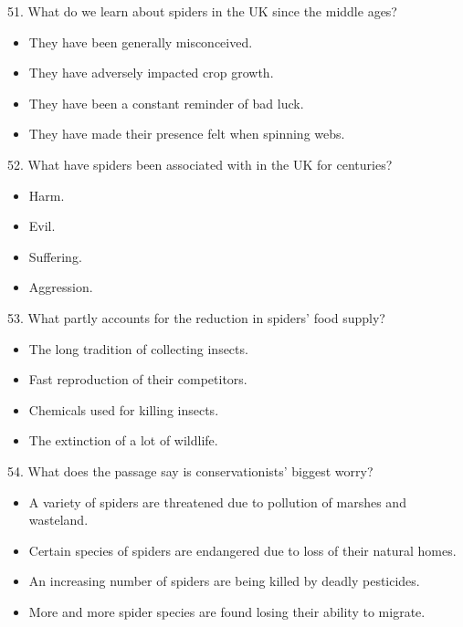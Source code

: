 \documentclass[UTF8,11pt]{ctexart}
\begin{document}
51. What do we learn about spiders in the UK since the middle ages?


\begin{itemize}[leftmargin=2em,itemsep=.2em,topsep=.4em]\item[A.] They have been generally misconceived.
\item[B.] They have adversely impacted crop growth.
\item[C.] They have been a constant reminder of bad luck.
\item[D.] They have made their presence felt when spinning webs.
\end{itemize}

52. What have spiders been associated with in the UK for centuries?


\begin{itemize}[leftmargin=2em,itemsep=.2em,topsep=.4em]\item[A.] Harm.
\item[B.] Evil.
\item[C.] Suffering.
\item[D.] Aggression.
\end{itemize}

53. What partly accounts for the reduction in spiders’ food supply?


\begin{itemize}[leftmargin=2em,itemsep=.2em,topsep=.4em]\item[A.] The long tradition of collecting insects.
\item[B.] Fast reproduction of their competitors.
\item[C.] Chemicals used for killing insects.
\item[D.] The extinction of a lot of wildlife.
\end{itemize}

54. What does the passage say is conservationists’ biggest worry?


\begin{itemize}[leftmargin=2em,itemsep=.2em,topsep=.4em]\item[A.] A variety of spiders are threatened due to pollution of marshes and wasteland.
\item[B.] Certain species of spiders are endangered due to loss of their natural homes.
\item[C.] An increasing number of spiders are being killed by deadly pesticides.
\item[D.] More and more spider species are found losing their ability to migrate.
\end{itemize}
\end{document}
